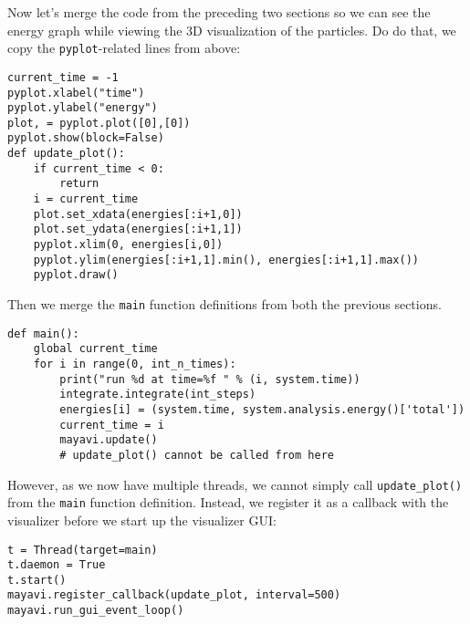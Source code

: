 \documentclass[
paper=a4,                       %
fontsize=11pt,                  %
twoside,                        %
footsepline,                    %
headsepline,                    %
headinclude=false,              %
footinclude=false,              %
pagesize,                       %
]{scrartcl}
\begin{document}
Now let's merge the code from the preceding two sections so we can see the energy graph while viewing the 3D visualization of the particles.
Do do that, we copy the \lstinline{pyplot}-related lines from above:
\begin{lstlisting}
current_time = -1
pyplot.xlabel("time")
pyplot.ylabel("energy")
plot, = pyplot.plot([0],[0])
pyplot.show(block=False)
def update_plot():
    if current_time < 0:
        return
    i = current_time
    plot.set_xdata(energies[:i+1,0])
    plot.set_ydata(energies[:i+1,1])
    pyplot.xlim(0, energies[i,0])
    pyplot.ylim(energies[:i+1,1].min(), energies[:i+1,1].max())
    pyplot.draw()
\end{lstlisting}
Then we merge the \lstinline{main} function definitions from both the previous sections.
\begin{lstlisting}
def main():
    global current_time
    for i in range(0, int_n_times):
        print("run %d at time=%f " % (i, system.time))
        integrate.integrate(int_steps)
        energies[i] = (system.time, system.analysis.energy()['total'])
        current_time = i
        mayavi.update()
        # update_plot() cannot be called from here
\end{lstlisting}
However, as we now have multiple threads, we cannot simply call \lstinline{update_plot()} from the \lstinline{main} function definition.
Instead, we register it as a callback with the visualizer before we start up the visualizer GUI:
\begin{lstlisting}
t = Thread(target=main)
t.daemon = True
t.start()
mayavi.register_callback(update_plot, interval=500)
mayavi.run_gui_event_loop()
\end{lstlisting}
\end{document}
